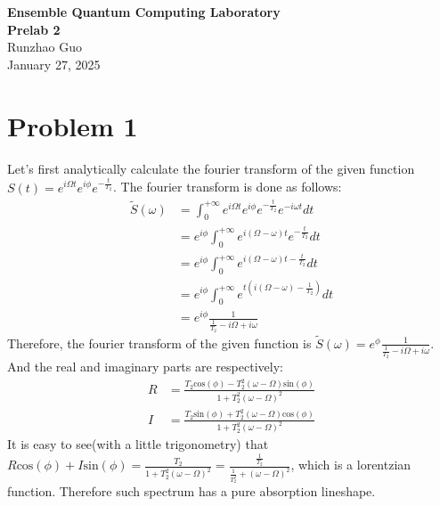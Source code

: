 \documentclass[11pt]{article}
\newcommand{\courseName}{Ensemble Quantum Computing Laboratory}     %
\newcommand{\assignmentTitle}{Prelab 2} %
\newcommand{\studentName}{Runzhao Guo}       %
\newcommand{\Date}{January 27, 2025}   %
\begin{document}
\begin{center}
    {\large \textbf{\courseName}} \\
    \vspace{3pt}
    {\Large \textbf{\assignmentTitle}} \\
    \vspace{3pt}
    \studentName \\
    \vspace{3pt}
    \Date
\end{center}

\vspace{0.5in} %

\section*{Problem 1}
Let's first analytically calculate the fourier transform of the given function $S(t) = e^{i\Omega t}e^{i\phi}e^{-\frac{t}{T_2}}$. The fourier transform is done as follows:\\
\begin{align*}
\tilde{S}(\omega) &=  \int_{0}^{+\infty} e^{i\Omega t}e^{i\phi}e^{-\frac{t}{T_2}}e^{-i\omega t}dt \\
                    &= e^{i\phi}\int_{0}^{+\infty} e^{i(\Omega-\omega)t}e^{-\frac{t}{T_2}}dt\\
                    &= e^{i\phi}\int_{0}^{+\infty} e^{i(\Omega-\omega)t-\frac{t}{T_2}}dt\\
                    &= e^{i\phi}\int_{0}^{+\infty} e^{t(i(\Omega-\omega)-\frac{1}{T_2})}dt\\
                    &= e^{i\phi} \frac{1}{\frac{1}{T_2} - i\Omega + i\omega}
\end{align*}
Therefore, the fourier transform of the given function is $\tilde{S}(\omega) = e^{\phi} \frac{1}{\frac{1}{T_2} - i\Omega + i\omega}$. And the real and imaginary parts are respectively:
\begin{align*}
    R &= \frac{T_2 \text{cos}(\phi) - T_2^2(\omega - \Omega)\text{sin}(\phi)}{1 + T_2^2(\omega - \Omega)^2}\\
    I &= \frac{T_2 \text{sin}(\phi) + T_2^2(\omega - \Omega)\text{cos}(\phi)}{1 + T_2^2(\omega - \Omega)^2}
\end{align*}
It is easy to see(with a little trigonometry) that $R\text{cos}(\phi) + I\text{sin}(\phi) = \frac{T_2}{1 + T_2^2(\omega - \Omega)^2} = \frac{\frac{1}{T_2}}{\frac{1}{T_2^2}+(\omega - \Omega)^2}$, which is a lorentzian function. Therefore such spectrum has a pure absorption lineshape.\\
\end{document}
